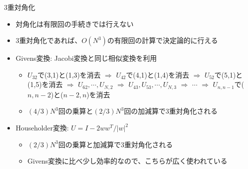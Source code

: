\begin{frame}[t,fragile]{3重対角化}
  \begin{itemize}
  \item 対角化は有限回の手続きでは行えない
  \item 3重対角化であれば、$O(N^3)$の有限回の計算で決定論的に行える
  \item Givens変換: Jacobi変換と同じ相似変換を利用
    \begin{itemize}
    \item $U_{32}$で(3,1)と(1,3)を消去 $\Rightarrow$ $U_{42}$で(4,1)と(1,4)を消去 $\Rightarrow$ $U_{52}$で(5,1)と(1,5)を消去 $\Rightarrow$ $U_{62},\cdots,U_{N,2}$ $\Rightarrow$ $U_{43},U_{53},\cdots,U_{N,3}$ $\Rightarrow$ $\cdots$ $\Rightarrow$ $U_{n,n-1}$で($n,n-2$)と($n-2,n$)を消去
    \item $(4/3)N^3$回の乗算と$(2/3)N^3$回の加減算で3重対角化される
    \end{itemize}
  \item Householder変換: $U = I - 2 w w^T / |w|^2$
    \begin{itemize}
    \item $(2/3)N^3$回の乗算と加減算で3重対角化される
    \item Givens変換に比べ少し効率的なので、こちらが広く使われている
    \end{itemize}
  \end{itemize}
\end{frame}
